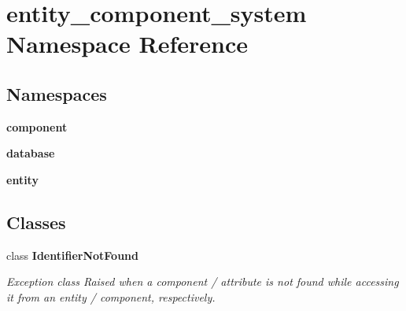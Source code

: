 \section{entity\+\_\+component\+\_\+system Namespace Reference}
\label{namespaceentity__component__system}
\subsection*{Namespaces}
\begin{DoxyCompactItemize}
\item 
 {\bf component}
\item 
 {\bf database}
\item 
 {\bf entity}
\end{DoxyCompactItemize}
\subsection*{Classes}
\begin{DoxyCompactItemize}
\item 
class {\bf Identifier\+Not\+Found}
\begin{DoxyCompactList}\small\item\em Exception class Raised when a component / attribute is not found while accessing it from an entity / component, respectively. \end{DoxyCompactList}\end{DoxyCompactItemize}
